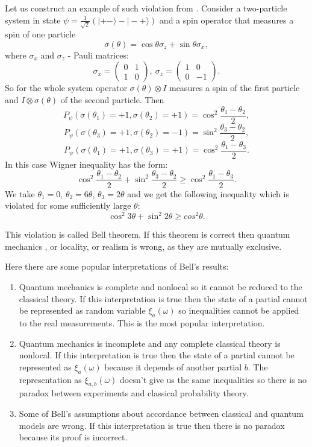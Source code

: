 \documentclass[11pt]{article}
\begin{document}
Let us construct an example of such violation from \cite{Khrennikov_information}. Consider a two-particle system in state $\psi = \frac{1}{\sqrt{2}}(|+-\rangle - |-+\rangle)$ and a spin operator that measures a spin of one particle
\[
\sigma(\theta) = \cos\theta\sigma_z + \sin\theta\sigma_x,
\] 
where $\sigma_x$ and $\sigma_z$ - Pauli matrices:
\[
\sigma_x = 
\begin{pmatrix}
0 & 1\\
1 & 0
\end{pmatrix},\ \sigma_z = 
\begin{pmatrix}
1 & 0\\
0 & -1
\end{pmatrix}.
\]
So for the whole system operator $\sigma(\theta) \otimes I$ measures a spin of the first particle and $I \otimes \sigma(\theta)$ of the second particle.
Then
\[
P_\psi(\sigma(\theta_1) = + 1, \sigma(\theta_2) = +1) = \cos^2\frac{\theta_1 - \theta_2}{2},
\]
\[
P_\psi(\sigma(\theta_3) = + 1, \sigma(\theta_2) = -1) = \sin^2\frac{\theta_3 - \theta_2}{2},
\]
\[
P_\psi(\sigma(\theta_1) = + 1, \sigma(\theta_3) = +1) = \cos^2\frac{\theta_1 - \theta_3}{2}.
\]
In this case Wigner inequality has the form:
\[
\cos^2\frac{\theta_1 - \theta_2}{2} + \sin^2\frac{\theta_3 - \theta_2}{2} \geq  \cos^2\frac{\theta_1 - \theta_3}{2}.
\]
We take $\theta_1 = 0$, $\theta_2 = 6\theta$, $\theta_3 = 2\theta$ and we get the following inequality which is violated for some sufficiently large $\theta$:
\[
\cos^2 3\theta + \sin^2 2\theta \geq cos^2 \theta.
\]

This violation is called Bell theorem.  If this theorem is correct then quantum mechanics , or locality, or realism is wrong, as they are mutually exclusive. 

Here there are some popular interpretations of Bell's results:
\begin{enumerate}
\item Quantum mechanics is complete and nonlocal so it cannot be reduced to the classical theory.
If this interpretation is true then the state of a partial cannot be represented as random variable $\xi_a(\omega)$ so inequalities cannot be applied to the real measurements. This is the most popular interpretation.

\item Quantum mechanics is incomplete and any complete classical theory is nonlocal.
If this interpretation is true then the state of a partial cannot be represented as $\xi_a(\omega)$ because it depends of another partial $b$. The representation as $\xi_{a,b}(\omega)$ doesn't give us the same inequalities so there is no paradox between experiments and classical probability theory.

\item Some of Bell's assumptions about accordance between classical and quantum models are wrong. If this interpretation is true then there is no paradox because its proof is incorrect.
\end{enumerate}
\end{document}
